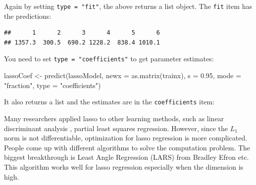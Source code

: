 \documentclass[
  12pt,
]{krantz}
\makeatletter
\newenvironment{Shaded}{\begin{snugshade}}{\end{snugshade}}
\newcommand{\AttributeTok}[1]{\textcolor[rgb]{0.61,0.61,0.61}{#1}}
\newcommand{\CommentTok}[1]{\textcolor[rgb]{0.37,0.37,0.37}{\textit{#1}}}
\newcommand{\FloatTok}[1]{\textcolor[rgb]{0.06,0.06,0.06}{#1}}
\newcommand{\FunctionTok}[1]{\textcolor[rgb]{0,0,0}{#1}}
\newcommand{\NormalTok}[1]{#1}
\newcommand{\OtherTok}[1]{\textcolor[rgb]{0.37,0.37,0.37}{#1}}
\newcommand{\SpecialCharTok}[1]{\textcolor[rgb]{0,0,0}{#1}}
\newcommand{\StringTok}[1]{\textcolor[rgb]{0.5,0.5,0.5}{#1}}
\newenvironment{kframe}{%
\medskip{}
\setlength{\fboxsep}{.8em}
 \def\at@end@of@kframe{}%
 \ifinner\ifhmode%
  \def\at@end@of@kframe{\end{minipage}}%
  \begin{minipage}{\columnwidth}%
 \fi\fi%
 \def\FrameCommand##1{\hskip\@totalleftmargin \hskip-\fboxsep
 \colorbox{shadecolor}{##1}\hskip-\fboxsep
     \hskip-\linewidth \hskip-\@totalleftmargin \hskip\columnwidth}%
 \MakeFramed {\advance\hsize-\width
   \@totalleftmargin\z@ \linewidth\hsize
   \@setminipage}}%
 {\par\unskip\endMakeFramed%
 \at@end@of@kframe}
\renewenvironment{Shaded}{\begin{kframe}}{\end{kframe}}
\makeatother
\begin{document}
Again by setting \texttt{type\ =\ "fit"}, the above returns a list object. The \texttt{fit} item has the predictions:

\begin{Shaded}
\end{Shaded}

\begin{verbatim}
##      1      2      3      4      5      6 
## 1357.3  300.5  690.2 1228.2  838.4 1010.1
\end{verbatim}

You need to set \texttt{type\ =\ "coefficients"} to get parameter estimates:

\begin{Shaded}
\begin{Highlighting}[]
\NormalTok{lassoCoef }\OtherTok{\textless{}{-}} \FunctionTok{predict}\NormalTok{(lassoModel, }
                     \AttributeTok{newx =} \FunctionTok{as.matrix}\NormalTok{(trainx), }
                     \AttributeTok{s =} \FloatTok{0.95}\NormalTok{, }
                     \AttributeTok{mode =} \StringTok{"fraction"}\NormalTok{, }
                     \AttributeTok{type =} \StringTok{"coefficients"}\NormalTok{)}
\end{Highlighting}
\end{Shaded}

It also returns a list and the estimates are in the \texttt{coefficients} item:

\begin{Shaded}
\end{Shaded}

Many researchers applied lasso to other learning methods, such as linear discriminant analysis \citep{Clem2011}, partial least squares regression\citep{chun2010}. However, since the \(L_1\) norm is not differentiable, optimization for lasso regression is more complicated. People come up with different algorithms to solve the computation problem. The biggest breakthrough is Least Angle Regression (LARS) from Bradley Efron etc. This algorithm works well for lasso regression especially when the dimension is high.
\end{document}

